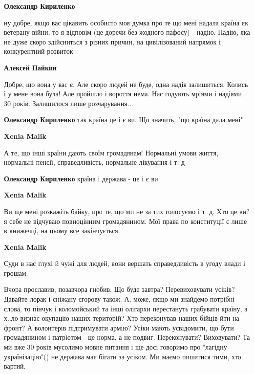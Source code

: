 \begin{itemize}
\begin{itemize}
\textbf{Олександр Кириленко} 

ну добре, якщо вас цікавить особисто моя думка про те що мені надала країна як
ветерану війни, то я відповім (це доречи без жодного пафосу) - надію. Надію,
яка не дуже скоро здійсниться з різних причин, на цивілізований напрямок і
конкурентний розвиток


\textbf{Алексей Пайкин} 

Добре, що вона у вас є. Але скоро людей не буде, одна надія залишиться. Колись і у
мене вона була! Але пройшло і вороття нема. Нас годують мріями і надіями 30
років. Залишилося лише розчарування...

\textbf{Олександр Кириленко} так країна це і є ви. Що значить, "що країна дала мені"

\textbf{Xenia Malik} 

А те, що інші країни дають своїм громадянам! Нормальні умови життя, нормальні
пенсії, справедливість, нормальне лікування і т. д


\textbf{Олександр Кириленко} країна і держава - це і є ви

\textbf{Xenia Malik} 

Ви ще мені розкажіть байку, про те, що ми не за тих голосуємо і т. д. Хто це ви? я
себе не відчуваю повноцінним громадянином. Мої права по конституції є лише в
книжечці, на цьому все закінчується.

\textbf{Xenia Malik} 

Суди в нас глухі й чужі для людей, вони вершать справедливість в угоду влади і
грошам.

\end{itemize} %


Вчора прославив, позавчора гнобив. Що буде завтра? Перевиховувати усіків?
Давайте лорак і сніжану єгорову також. А, може, якщо ми знайдемо потрібні
слова, то пінчук і коломойський та інші олігархи перестануть грабувати країну,
а х..ло визнає окупацію наших територій? Хто переконував наших бійців йти на
фронт? А волонтерів підтримувати армію? Усіки мають усвідомити, що бути
громадянином і патріотом - це норма, а не подвиг. Переконувати? Виховувати? Та
ми вже 30 років мусолимо мовне питання і ще досі говоримо про "лагідну
українізацію"(( не держава має бігати за усіком. Ми маємо пишатися тими, хто
вартий.


\end{itemize}
